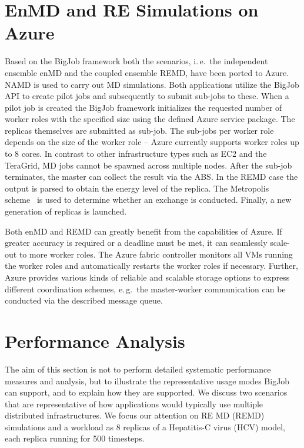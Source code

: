 \documentclass[conference,final]{IEEEtran}
\newcommand{\up}{\vspace*{-1em}}
\newcommand{\numrep}{8 }
\begin{document}
\section{EnMD and RE Simulations on Azure}
\label{sec:enMD-REMD}
\up
Based on the BigJob framework both the scenarios, i.\,e.\ the
independent ensemble enMD and the coupled ensemble REMD,
have been ported to Azure. NAMD is used to carry out MD simulations.
Both applications utilize the BigJob API to create pilot jobs
and subsequently to submit sub-jobs to these. When a pilot job is
created the BigJob framework initializes the requested number
of worker roles with the specified size using the defined 
Azure service package. The replicas themselves are submitted as
sub-job. The sub-jobs per worker role depends on the size of the worker role --
Azure currently supports worker roles up to 8 cores. In contrast
to other infrastructure types such as EC2 and the TeraGrid, MD jobs
cannot be spawned across multiple nodes. After the sub-job terminates,
the master can collect the result via the ABS. In the REMD
case the output is parsed to obtain the energy level of the replica. 
The Metropolis scheme~\cite{metropolis:1087} is used to determine whether
an exchange is conducted. Finally, a new generation of replicas is launched.

Both enMD and REMD can greatly benefit from the capabilities of Azure. If greater 
accuracy is required or a deadline must be met, it can 
seamlessly scale-out to more worker roles.  The
Azure fabric controller monitors all VMs running the worker roles and
automatically restarts the worker roles if necessary. Further, Azure
provides various kinds of reliable and scalable storage options to
express different coordination schemes, e.\,g.\ the master-worker
communication can be conducted via the described message queue.


\up
\section{Performance Analysis}
\label{sec:performance}
\up
The aim of this section is not to perform detailed systematic
performance measures and analysis, but to illustrate the
representative usage modes BigJob can support, and to explain how they
are supported.  We discuss two scenarios that are representative of
how applications would typically use multiple distributed
infrastructures. We focus our attention on RE MD (REMD)
simulations and a workload as \numrep replicas of a Hepatitis-C virus
(HCV) model, each replica running for 500 timesteps.
\end{document}
